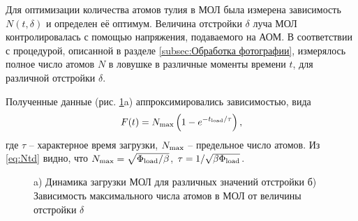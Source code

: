 


\startp
{}
Для оптимизации количества атомов тулия в МОЛ была измерена зависимость $N(t, \delta)$ и определен её оптимум. Величина отстройки $\delta$ луча МОЛ контролировалась с помощью напряжения, подаваемого на АОМ. В соответствии с процедурой, описанной в разделе \ref{subsec:Обработка фотографии}, измерялось полное число атомов $N$ в ловушке в различные моменты времени $t$, для различной отстройки $\delta$. 

Полученные данные (рис. \ref{fig:motload}a) аппроксимировались зависимостью, вида
\begin{equation}
	F(t) = N_{\textnormal{max}} \left(1- e^{-t_{\textnormal{load}}/\tau}\right),
\end{equation}
где $\tau$ -- характерное время загрузки, $N_{\textnormal{max}}$ -- предельное число атомов. Из \eqref{eq:Ntd} видно, что $N_{\textnormal{max}} = \sqrt{\Phi_{\textnormal{load}}/\beta}$, $\tau = 1/\sqrt{\beta \Phi_{\textnormal{load}}}$.

\begin{figure}[htb]
    \centering
    \hspace{10 mm} 
    \caption{a) Динамика загрузки МОЛ для различных значений отстройки б)  Зависимость максимального числа атомов в МОЛ от величины отстройки $\delta$}
    \label{fig:motload}
\end{figure}




